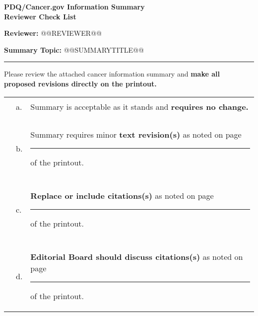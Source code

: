 \documentclass[letterpaper,12pt]{letter}
\begin{document}
\thispagestyle{empty}

\begin{center}
 \textbf{PDQ\textregistered/Cancer.gov Information Summary \\
         Reviewer Check List}
\end{center}

\vspace{24pt}

\textbf{Reviewer: } @@REVIEWER@@

\vspace{12pt}

\textbf{Summary Topic: } @@SUMMARYTITLE@@

\rule{6.5in}{.02in}

\vspace{12pt}

Please review the attached cancer information summary and \textbf{make
all proposed revisions directly on the printout.}

\vspace{12pt}

\begin{tabular}{llp{4.5in}}
\hspace{.25in}\rule{1in}{.01in} & a. & Summary is acceptable as it stands 
                                      and \textbf{requires no change.} \\
\\
\hspace{.25in}\rule{1in}{.01in} & b. & Summary requires minor \textbf{text
                                      revision(s)} as noted on page
                                      \rule{.5in}{.01in} of the printout. \\
\\
\hspace{.25in}\rule{1in}{.01in} & c. & \textbf{Replace or include citations(s)}
                                      as noted on page \rule{.5in}{.01in}
                                      of the printout. \\
\\
\hspace{.25in}\rule{1in}{.01in} & d. & \textbf{Editorial Board should discuss
                                      citations(s)} as noted on page
                                      \rule{.5in}{.01in} of the printout.
\end{tabular}
\end{document}
